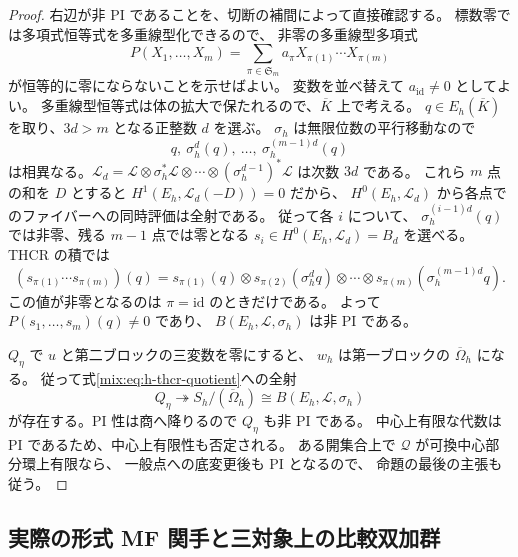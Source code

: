 \begin{proof}
右辺が非 PI であることを、切断の補間によって直接確認する。
標数零では多項式恒等式を多重線型化できるので、
非零の多重線型多項式
\[
 P(X_1,\ldots,X_m)
   =\sum_{\pi\in\mathfrak S_m}
       a_\pi X_{\pi(1)}\cdots X_{\pi(m)}
\]
が恒等的に零にならないことを示せばよい。
変数を並べ替えて $a_{\mathrm{id}}\ne0$ としてよい。
多重線型恒等式は体の拡大で保たれるので、$\overline K$ 上で考える。
$q\in E_h(\overline K)$ を取り、$3d>m$ となる正整数 $d$ を選ぶ。
$\sigma_h$ は無限位数の平行移動なので
\[
 q,\ \sigma_h^d(q),\ \ldots,\ \sigma_h^{(m-1)d}(q)
\]
は相異なる。$\mathcal L_d=
\mathcal L\otimes\sigma_h^*\mathcal L\otimes\cdots\otimes
(\sigma_h^{d-1})^*\mathcal L$ は次数 $3d$ である。
これら $m$ 点の和を $D$ とすると
$H^1(E_h,\mathcal L_d(-D))=0$ だから、
$H^0(E_h,\mathcal L_d)$ から各点でのファイバーへの同時評価は全射である。
従って各 $i$ について、
$\sigma_h^{(i-1)d}(q)$ では非零、残る $m-1$ 点では零となる
$s_i\in H^0(E_h,\mathcal L_d)=B_d$ を選べる。
THCR の積では
\[
 (s_{\pi(1)}\cdots s_{\pi(m)})(q)
 =s_{\pi(1)}(q)\otimes
   s_{\pi(2)}(\sigma_h^d q)\otimes\cdots\otimes
   s_{\pi(m)}(\sigma_h^{(m-1)d}q).
\]
この値が非零となるのは $\pi=\mathrm{id}$ のときだけである。
よって $P(s_1,\ldots,s_m)(q)\ne0$ であり、
$B(E_h,\mathcal L,\sigma_h)$ は非 PI である。

$Q_\eta$ で $u$ と第二ブロックの三変数を零にすると、
$w_h$ は第一ブロックの $\overline\Omega_h$ になる。
従って式\eqref{mix:eq:h-thcr-quotient}への全射
\[
 Q_\eta\twoheadrightarrow
 S_h/(\overline\Omega_h)
 \cong B(E_h,\mathcal L,\sigma_h)
\]
が存在する。PI 性は商へ降りるので $Q_\eta$ も非 PI である。
中心上有限な代数は PI であるため、中心上有限性も否定される。
ある開集合上で $\mathscr Q$ が可換中心部分環上有限なら、
一般点への底変更後も PI となるので、
命題の最後の主張も従う。
\end{proof}

\subsection{実際の形式 MF 関手と三対象上の比較双加群}

